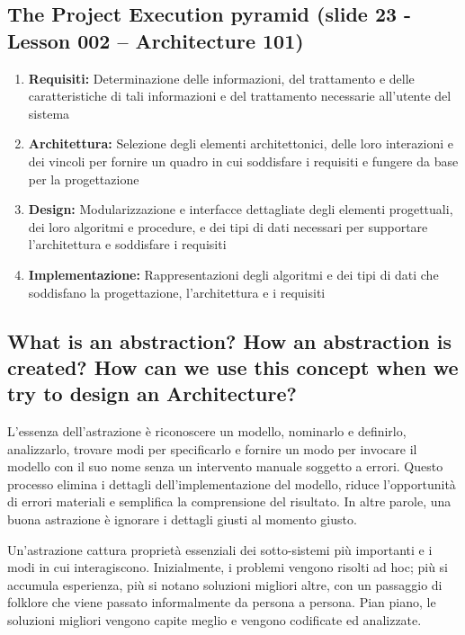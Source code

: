 \documentclass{article}
\begin{document}
\subsection{The Project Execution pyramid (slide 23 - Lesson 002 – Architecture 101)}
\begin{enumerate}
    \item \textbf{Requisiti:} Determinazione delle informazioni, del trattamento e delle caratteristiche di tali informazioni e del trattamento necessarie all'utente del sistema
    \item \textbf{Architettura:} Selezione degli elementi architettonici, delle loro interazioni e dei vincoli per fornire un quadro in cui soddisfare i requisiti e fungere da base per la progettazione
    \item \textbf{Design:} Modularizzazione e interfacce dettagliate degli elementi progettuali, dei loro algoritmi e procedure, e dei tipi di dati necessari per supportare l'architettura e soddisfare i requisiti
    \item \textbf{Implementazione:} Rappresentazioni degli algoritmi e dei tipi di dati che soddisfano la progettazione, l'architettura e i requisiti

\end{enumerate}
\subsection{What is an abstraction? How an abstraction is created? How can we use this concept when we try to design an Architecture?}
L'essenza dell'astrazione è riconoscere un modello, nominarlo e definirlo, analizzarlo, trovare modi per specificarlo e fornire un modo per invocare il modello con il suo nome senza un intervento manuale soggetto a errori.
Questo processo elimina i dettagli dell'implementazione del modello, riduce l'opportunità di errori materiali e semplifica la comprensione del risultato.
In altre parole, una buona astrazione è ignorare i dettagli giusti al momento giusto.

Un'astrazione cattura proprietà essenziali dei sotto-sistemi più importanti e i modi in cui interagiscono. Inizialmente, i problemi vengono risolti ad hoc; più si accumula esperienza, più si notano soluzioni migliori altre, con un passaggio di folklore che viene passato informalmente da persona a persona. Pian piano, le soluzioni migliori vengono capite meglio e vengono codificate ed analizzate.
\end{document}
